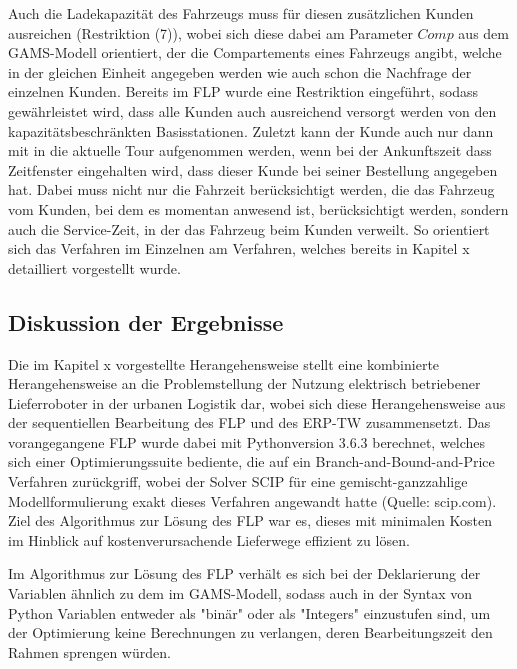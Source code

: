 \documentclass[a4paper,12pt,parskip,bibtotoc,liststotoc]{article}
\begin{document}
Auch die Ladekapazität des Fahrzeugs muss für diesen zusätzlichen Kunden ausreichen (Restriktion (7)), wobei sich diese dabei am Parameter $Comp$ aus dem GAMS-Modell orientiert, der die Compartements eines Fahrzeugs angibt, welche in der gleichen Einheit angegeben werden wie auch schon die Nachfrage der einzelnen Kunden.
Bereits im FLP wurde eine Restriktion eingeführt, sodass gewährleistet wird, dass alle Kunden auch ausreichend versorgt werden von den kapazitätsbeschränkten Basisstationen.
Zuletzt kann der Kunde auch nur dann mit in die aktuelle Tour aufgenommen werden, wenn bei der Ankunftszeit dass Zeitfenster eingehalten wird, dass dieser Kunde bei seiner Bestellung angegeben hat.
Dabei muss nicht nur die Fahrzeit berücksichtigt werden, die das Fahrzeug vom Kunden, bei dem es momentan anwesend ist, berücksichtigt werden, sondern auch die Service-Zeit, in der das Fahrzeug beim Kunden verweilt. 
So orientiert sich das Verfahren im Einzelnen am Verfahren, welches bereits in Kapitel x detailliert vorgestellt wurde.










\subsection{Diskussion der Ergebnisse}

Die im Kapitel x vorgestellte Herangehensweise stellt eine kombinierte Herangehensweise an die Problemstellung der Nutzung elektrisch betriebener Lieferroboter in der urbanen Logistik dar, wobei sich diese Herangehensweise aus der sequentiellen Bearbeitung des FLP und des ERP-TW zusammensetzt.
Das vorangegangene FLP wurde dabei mit Pythonversion 3.6.3 berechnet, welches sich einer Optimierungssuite bediente, die auf ein Branch-and-Bound-and-Price Verfahren zurückgriff, wobei der Solver SCIP für eine gemischt-ganzzahlige Modellformulierung exakt dieses Verfahren angewandt hatte (Quelle: scip.com).
Ziel des Algorithmus zur Lösung des FLP war es, dieses mit minimalen Kosten im Hinblick auf kostenverursachende Lieferwege effizient zu lösen.



Im Algorithmus zur Lösung des FLP verhält es sich bei der Deklarierung der Variablen ähnlich zu dem im GAMS-Modell, sodass auch in der Syntax von Python Variablen entweder als "binär" oder als "Integers" einzustufen sind, um der Optimierung keine Berechnungen zu verlangen, deren Bearbeitungszeit den Rahmen sprengen würden.
\end{document}
